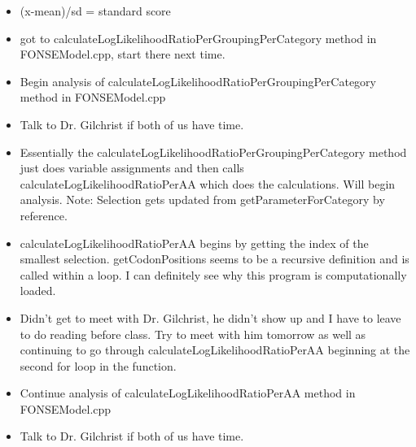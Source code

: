 \documentclass[letterpaper,index=totoc,hyperref,openany]{labbook} %
\begin{document}
\begin{itemize}
	\item (x-mean)/sd = standard score
	\item got to calculateLogLikelihoodRatioPerGroupingPerCategory method in FONSEModel.cpp, start there next time.
\end{itemize}


\begin{itemize}
	\item Begin analysis of calculateLogLikelihoodRatioPerGroupingPerCategory method in FONSEModel.cpp
	\item Talk to Dr. Gilchrist if both of us have time.
\end{itemize}

\begin{itemize}
	\item Essentially the calculateLogLikelihoodRatioPerGroupingPerCategory method just does variable assignments and then calls calculateLogLikelihoodRatioPerAA which does the calculations. Will begin analysis.  Note: Selection gets updated from getParameterForCategory by reference.
	\item calculateLogLikelihoodRatioPerAA begins by getting the index of the smallest selection. getCodonPositions seems to be a recursive definition and is called within a loop. I can definitely see why this program is computationally loaded. 
	\item Didn't get to meet with Dr. Gilchrist, he didn't show up and I have to leave to do reading before class. Try to meet with him tomorrow as well as continuing to go through calculateLogLikelihoodRatioPerAA beginning at the second for loop in the function.
\end{itemize}


\begin{itemize}
	\item Continue analysis of calculateLogLikelihoodRatioPerAA method in FONSEModel.cpp
	\item Talk to Dr. Gilchrist if both of us have time.
\end{itemize}
\end{document}
